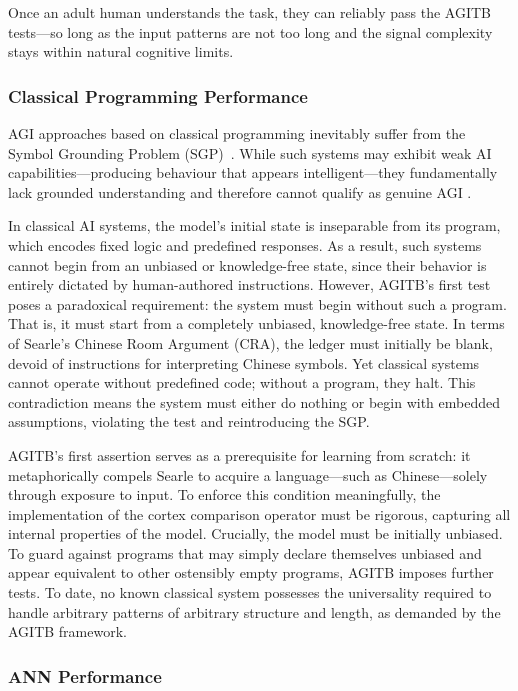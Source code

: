 \documentclass{article}
\begin{document}
Once an adult human understands the task, they can reliably pass the AGITB tests—so long as the input patterns are not too long and the signal complexity stays within natural cognitive limits.


\subsubsection{Classical Programming Performance}

AGI approaches based on classical programming inevitably suffer from the Symbol Grounding Problem (SGP)~\cite{Harnad1990}. While such systems may exhibit weak AI capabilities—producing behaviour that appears intelligent—they fundamentally lack grounded understanding and therefore cannot qualify as genuine AGI \cite{Searle1980}.

In classical AI systems, the model's initial state is inseparable from its program, which encodes fixed logic and predefined responses. As a result, such systems cannot begin from an unbiased or knowledge-free state, since their behavior is entirely dictated by human-authored instructions. However, AGITB's first test poses a paradoxical requirement: the system must begin without such a program. That is, it must start from a completely unbiased, knowledge-free state. In terms of Searle’s Chinese Room Argument (CRA), the ledger must initially be blank, devoid of instructions for interpreting Chinese symbols. Yet classical systems cannot operate without predefined code; without a program, they halt. This contradiction means the system must either do nothing or begin with embedded assumptions, violating the test and reintroducing the SGP.

AGITB’s first assertion serves as a prerequisite for learning from scratch: it metaphorically compels Searle to acquire a language—such as Chinese—solely through exposure to input. To enforce this condition meaningfully, the implementation of the cortex comparison operator must be rigorous, capturing all internal properties of the model. Crucially, the model must be initially unbiased. To guard against programs that may simply declare themselves unbiased and appear equivalent to other ostensibly empty programs, AGITB imposes further tests. To date, no known classical system possesses the universality required to handle arbitrary patterns of arbitrary structure and length, as demanded by the AGITB framework.

\subsubsection{ANN Performance}
\end{document}
